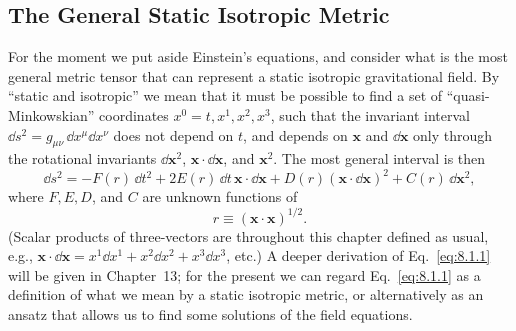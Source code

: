 
\subsection{The General Static Isotropic Metric}\label{sec:8.1}

For the moment we put aside Einstein's equations, and consider what is the
most general metric tensor that can represent a static isotropic
gravitational field. By ``static and isotropic'' we mean that it must be
possible to find a set of ``quasi-Minkowskian'' coordinates
\(x^0=t,x^1,x^2,x^3\), such that the invariant interval
\(\dd s^2=g_{\mu\nu}\,\dd x^\mu \dd x^\nu\) does not depend on \(t\), and depends on
\(\mathbf{x}\) and \(\dd\mathbf{x}\) only through the rotational invariants
\(\dd\mathbf{x}^2\), \(\mathbf{x}\cdot \dd\mathbf{x}\), and
\(\mathbf{x}^2\). The most general interval is then
\begin{equation}
  \dd s^2
  =
  -F(r)\,\dd t^2
  +2E(r)\,\dd t\,\mathbf{x}\cdot \dd\mathbf{x}
  +D(r)(\mathbf{x}\cdot \dd\mathbf{x})^2
  +C(r)\,\dd\mathbf{x}^2,
  \tag{8.1.1}\label{eq:8.1.1}
\end{equation}
where \(F,E,D\), and \(C\) are unknown functions of
\[
  r\equiv(\mathbf{x}\cdot\mathbf{x})^{1/2}.
\]
(Scalar products of three-vectors are throughout this chapter defined as
usual, e.g.,
\(\mathbf{x}\cdot \dd\mathbf{x}
=x^1\dd x^1+x^2\dd x^2+x^3\dd x^3\), etc.) A deeper derivation of
Eq.~\eqref{eq:8.1.1} will be given in Chapter~13; for the present we can
regard Eq.~\eqref{eq:8.1.1} as a definition of what we mean by a static
isotropic metric, or alternatively as an ansatz that allows us to find some
solutions of the field equations.

